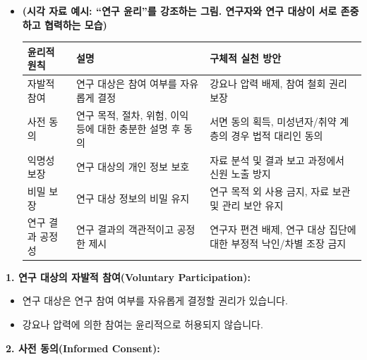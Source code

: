 \documentclass[
  letterpaper,
]{book}
\providecommand{\tightlist}{%
  \setlength{\itemsep}{0pt}\setlength{\parskip}{0pt}}
\begin{document}
\begin{itemize}
\item
  \textbf{(시각 자료 예시: ``연구 윤리''를 강조하는 그림. 연구자와 연구
  대상이 서로 존중하고 협력하는 모습)}

  \begin{longtable}[]{@{}
    >{\centering\arraybackslash}p{}
    >{\centering\arraybackslash}p{}
    >{\centering\arraybackslash}p{}@{}}
  \toprule\noalign{}
  \begin{minipage}[b]{\linewidth}\centering
  윤리적 원칙
  \end{minipage} & \begin{minipage}[b]{\linewidth}\centering
  설명
  \end{minipage} & \begin{minipage}[b]{\linewidth}\centering
  구체적 실천 방안
  \end{minipage} \\
  \midrule\noalign{}
  \endhead
  \bottomrule\noalign{}
  \endlastfoot
  자발적 참여 & 연구 대상은 참여 여부를 자유롭게 결정 & 강요나 압력
  배제, 참여 철회 권리 보장 \\
  사전 동의 & 연구 목적, 절차, 위험, 이익 등에 대한 충분한 설명 후 동의
  & 서면 동의 획득, 미성년자/취약 계층의 경우 법적 대리인 동의 \\
  익명성 보장 & 연구 대상의 개인 정보 보호 & 자료 분석 및 결과 보고
  과정에서 신원 노출 방지 \\
  비밀 보장 & 연구 대상 정보의 비밀 유지 & 연구 목적 외 사용 금지, 자료
  보관 및 관리 보안 유지 \\
  연구 결과 공정성 & 연구 결과의 객관적이고 공정한 제시 & 연구자 편견
  배제, 연구 대상 집단에 대한 부정적 낙인/차별 조장 금지 \\
  \end{longtable}
\end{itemize}

\textbf{1. 연구 대상의 자발적 참여(Voluntary Participation):}

\begin{itemize}
\tightlist
\item
  연구 대상은 연구 참여 여부를 자유롭게 결정할 권리가 있습니다.
\item
  강요나 압력에 의한 참여는 윤리적으로 허용되지 않습니다.
\end{itemize}

\textbf{2. 사전 동의(Informed Consent):}
\end{document}
